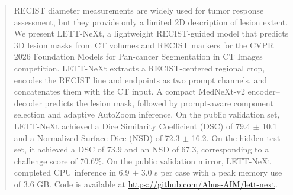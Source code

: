 \begin{abstract}
RECIST diameter measurements are widely used for tumor response assessment, but they provide only a limited 2D description of lesion extent. We present LETT-NeXt, a lightweight RECIST-guided model that predicts 3D lesion masks from CT volumes and RECIST markers for the CVPR 2026 Foundation Models for Pan-cancer Segmentation in CT Images competition. LETT-NeXt extracts a RECIST-centered regional crop, encodes the RECIST line and endpoints as two prompt channels, and concatenates them with the CT input. A compact MedNeXt-v2 encoder--decoder predicts the lesion mask, followed by prompt-aware component selection and adaptive AutoZoom inference. On the public validation set, LETT-NeXt achieved a Dice Similarity Coefficient (DSC) of 79.4 $\pm$ 10.1 and a Normalized Surface Dice (NSD) of 72.3 $\pm$ 16.2. On the hidden test set, it achieved a DSC of 73.9 and an NSD of 67.3, corresponding to a challenge score of 70.6\%. On the public validation mirror, LETT-NeXt completed CPU inference in 6.9 $\pm$ 3.0 s per case with a peak memory use of 3.6 GB. Code is available at \url{https://github.com/Ahus-AIM/lett-next}.
\end{abstract}

